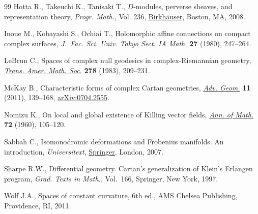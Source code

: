 \documentclass[10pt,a4paper]{amsart}
\numberwithin{equation}{section}
\begin{document}
\begin{thebibliography}{99}
Hotta R., Takeuchi K., Tanisaki T., {$D$}-modules, perverse sheaves, and
 representation theory, \textit{Progr. Math.}, Vol. 236, \href{https://doi.org/10.1007/978-0-8176-4523-6}{Birkh\"auser}, Boston,
 MA, 2008.

Inoue M., Kobayashi S., Ochiai T., Holomorphic affine connections on compact
 complex surfaces, \textit{J.~Fac. Sci. Univ. Tokyo Sect. IA Math.}
 \textbf{27} (1980), 247--264.

LeBrun C., Spaces of complex null geodesics in complex-{R}iemannian geometry,
 \href{https://doi.org/10.2307/1999312}{\textit{Trans. Amer. Math. Soc.}} \textbf{278} (1983), 209--231.

McKay B., Characteristic forms of complex {C}artan geometries, \href{https://doi.org/10.1515/ADVGEOM.2010.044}{\textit{Adv.
 Geom.}} \textbf{11} (2011), 139--168, \href{https://arxiv.org/abs/0704.2555}{arXiv:0704.2555}.

Nomizu K., On local and global existence of {K}illing vector fields,
\href{https://doi.org/10.2307/1970148}{\textit{Ann. of Math.}} \textbf{72} (1960), 105--120.

Sabbah C., Isomonodromic deformations and {F}robenius manifolds. An
 introduction, \textit{Universitext}, \href{https://doi.org/10.1007/978-1-84800-054-4}{Springer}, London, 2007.

Sharpe R.W., Differential geometry. Cartan's generalization of Klein's Erlangen
 program, \textit{Grad. Texts in Math.}, Vol.~166, Springer, New York, 1997.

Wolf J.A., Spaces of constant curvature, 6th ed., \href{https://doi.org/10.1090/chel/372}{AMS Chelsea Publishing},
 Providence, RI, 2011.

\end{thebibliography}
\end{document}
